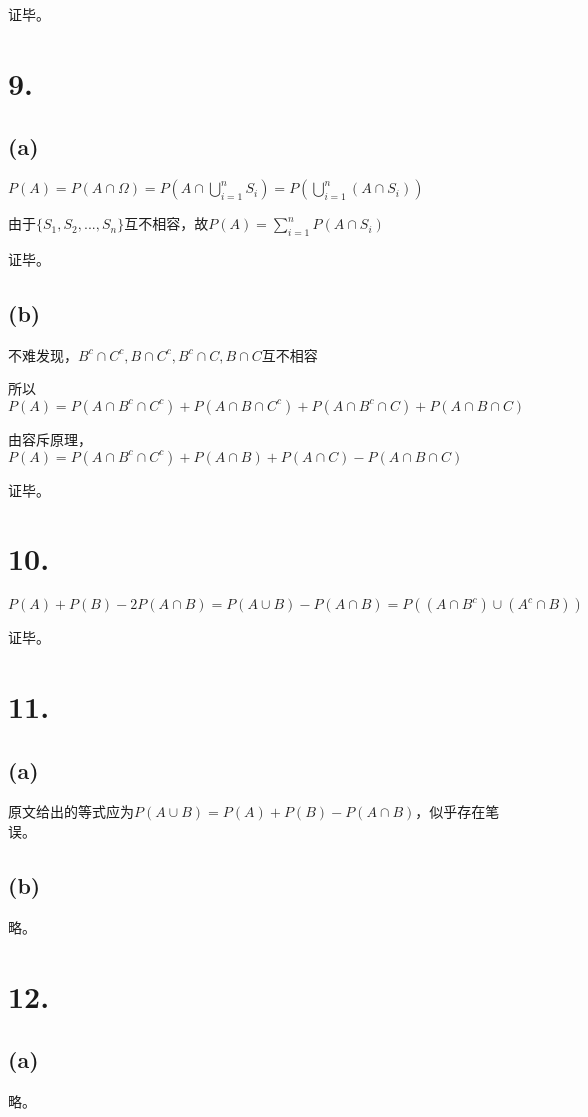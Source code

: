 \documentclass[UTF8]{report}
\begin{document}
        证毕。
    \section*{9.}
        \subsection*{(a)}
            $P(A) = P(A \cap \Omega) = P(A \cap \bigcup_{i = 1}^nS_i) = P(\bigcup_{i = 1}^n(A \cap S_i))$

            由于$\{S_1, S_2, ..., S_n\}$互不相容，故$P(A) = \sum_{i = 1}^nP(A \cap S_i)$

            证毕。
        \subsection*{(b)}
            不难发现，$B^c \cap C^c, B \cap C^c, B^c \cap C, B \cap C$互不相容

            所以$P(A) = P(A \cap B^c \cap C^c) + P(A \cap B \cap C^c) + P(A \cap B^c \cap C) + P(A \cap B \cap C)$

            由容斥原理，$P(A) = P(A \cap B^c \cap C^c) + P(A \cap B) + P(A \cap C) - P(A \cap B \cap C)$

            证毕。
    \section*{10.}
        $P(A) + P(B) - 2P(A \cap B) = P(A \cup B) - P(A \cap B) = P((A \cap B^c) \cup (A^c \cap B))$

        证毕。
    \section*{11.}
        \subsection*{(a)}
            原文给出的等式应为$P(A \cup B) = P(A) + P(B) - P(A \cap B)$，似乎存在笔误。
        \subsection*{(b)}
            略。
    \section*{12.}
        \subsection*{(a)}
            略。
\end{document}
